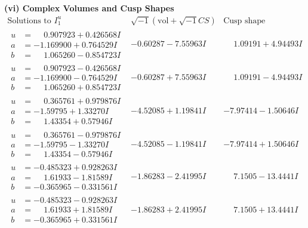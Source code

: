 \documentclass[1p]{elsarticle_modified}
\theoremstyle{definition}
\newcommand{\I}{\sqrt{-1}}
\begin{document}
\newpage\flushleft \textbf{(vi) Complex Volumes and Cusp Shapes}
$$\begin{array}{c|c|c}  
\text{Solutions to }I^u_{1}& \I (\text{vol} + \sqrt{-1}CS) & \text{Cusp shape}\\
 \hline 
\begin{aligned}
u &= \phantom{-}0.907923 + 0.426568 I \\
a &= -1.169900 + 0.764529 I \\
b &= \phantom{-}1.065260 - 0.854723 I\end{aligned}
 & -0.60287 - 7.55963 I & \phantom{-}1.09191 + 4.94493 I \\ \hline\begin{aligned}
u &= \phantom{-}0.907923 - 0.426568 I \\
a &= -1.169900 - 0.764529 I \\
b &= \phantom{-}1.065260 + 0.854723 I\end{aligned}
 & -0.60287 + 7.55963 I & \phantom{-}1.09191 - 4.94493 I \\ \hline\begin{aligned}
u &= \phantom{-}0.365761 + 0.979876 I \\
a &= -1.59795 + 1.33270 I \\
b &= \phantom{-}1.43354 + 0.57946 I\end{aligned}
 & -4.52085 + 1.19841 I & -7.97414 - 1.50646 I \\ \hline\begin{aligned}
u &= \phantom{-}0.365761 - 0.979876 I \\
a &= -1.59795 - 1.33270 I \\
b &= \phantom{-}1.43354 - 0.57946 I\end{aligned}
 & -4.52085 - 1.19841 I & -7.97414 + 1.50646 I \\ \hline\begin{aligned}
u &= -0.485323 + 0.928263 I \\
a &= \phantom{-}1.61933 - 1.81589 I \\
b &= -0.365965 - 0.331561 I\end{aligned}
 & -1.86283 - 2.41995 I & \phantom{-}7.1505 - 13.4441 I \\ \hline\begin{aligned}
u &= -0.485323 - 0.928263 I \\
a &= \phantom{-}1.61933 + 1.81589 I \\
b &= -0.365965 + 0.331561 I\end{aligned}
 & -1.86283 + 2.41995 I & \phantom{-}7.1505 + 13.4441 I \\ \hline\begin{aligned}

\end{aligned}
\end{array}$$
\end{document}
